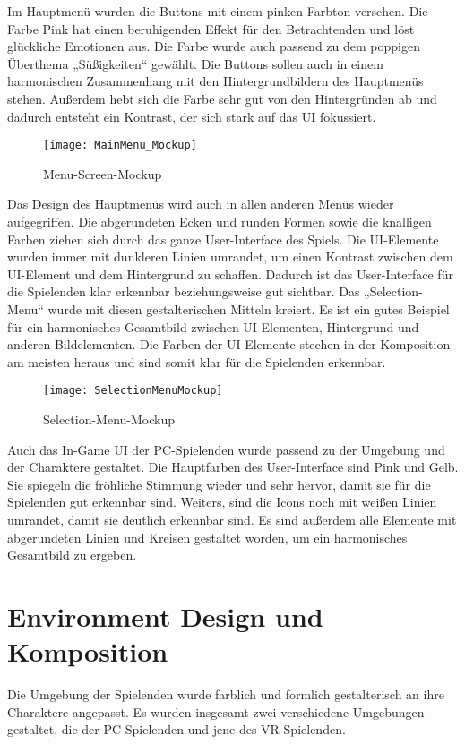 Im Hauptmenü wurden die Buttons mit einem pinken Farbton versehen. Die Farbe Pink hat einen beruhigenden Effekt für den Betrachtenden und löst glückliche Emotionen aus. Die Farbe wurde auch passend zu dem poppigen Überthema „Süßigkeiten“ gewählt. Die Buttons sollen auch in einem harmonischen Zusammenhang mit den Hintergrundbildern des Hauptmenüs stehen. Außerdem hebt sich die Farbe sehr gut von den Hintergründen ab und dadurch entsteht ein Kontrast, der sich stark auf das UI fokussiert. 

\begin{figure}[H]
	\centering
	\texttt{[image: MainMenu\_Mockup]}
	\caption{Menu-Screen-Mockup}
\end{figure}

Das Design des Hauptmenüs wird auch in allen anderen Menüs wieder aufgegriffen. Die abgerundeten Ecken und runden Formen sowie die knalligen Farben ziehen sich durch das ganze User-Interface des Spiels. Die UI-Elemente wurden immer mit dunkleren Linien umrandet, um einen Kontrast zwischen dem UI-Element und dem Hintergrund zu schaffen. Dadurch ist das User-Interface für die Spielenden klar erkennbar beziehungsweise gut sichtbar. Das „Selection-Menu“ wurde mit diesen gestalterischen Mitteln kreiert. Es ist ein gutes Beispiel für ein harmonisches Gesamtbild zwischen UI-Elementen, Hintergrund und anderen Bildelementen. Die Farben der UI-Elemente stechen in der Komposition am meisten heraus und sind somit klar für die Spielenden erkennbar.

\begin{figure}[H]
	\centering
	\texttt{[image: SelectionMenuMockup]}
	\caption{Selection-Menu-Mockup}
\end{figure}

Auch das In-Game UI der PC-Spielenden wurde passend zu der Umgebung und der Charaktere gestaltet. Die Hauptfarben des User-Interface sind Pink und Gelb. Sie spiegeln die fröhliche Stimmung wieder und sehr hervor, damit sie für die Spielenden gut erkennbar sind. Weiters, sind die Icons noch mit weißen Linien umrandet, damit sie deutlich erkennbar sind. Es sind außerdem alle Elemente mit abgerundeten Linien und Kreisen gestaltet worden, um ein harmonisches Gesamtbild zu ergeben.

\section{Environment Design und Komposition}
Die Umgebung der Spielenden wurde farblich und formlich gestalterisch an ihre Charaktere angepasst. Es wurden insgesamt zwei verschiedene Umgebungen gestaltet, die der PC-Spielenden und jene des VR-Spielenden. 

